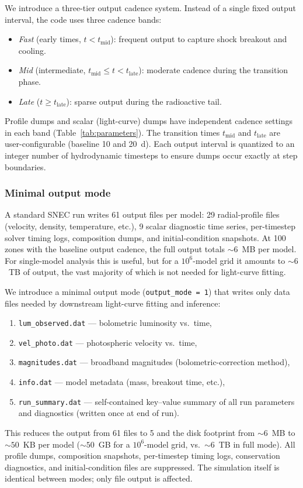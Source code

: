 \documentclass[twocolumn,linenumbers]{aastex701}
\begin{document}
We introduce a three-tier output cadence system. Instead of a single fixed output interval, the code uses three cadence bands:
\begin{itemize}
\item \textit{Fast} (early times, $t < t_{\mathrm{mid}}$): frequent output to capture shock breakout and cooling.
\item \textit{Mid} (intermediate, $t_{\mathrm{mid}} \leq t < t_{\mathrm{late}}$): moderate cadence during the transition phase.
\item \textit{Late} ($t \geq t_{\mathrm{late}}$): sparse output during the radioactive tail.
\end{itemize}
Profile dumps and scalar (light-curve) dumps have independent cadence settings in each band (Table~\ref{tab:parameters}). The transition times $t_{\mathrm{mid}}$ and $t_{\mathrm{late}}$ are user-configurable (baseline 10 and 20~d). Each output interval is quantized to an integer number of hydrodynamic timesteps to ensure dumps occur exactly at step boundaries.

\subsubsection{Minimal output mode}
\label{sec:output_mode}

A standard SNEC run writes 61 output files per model: 29 radial-profile files (velocity, density, temperature, etc.), 9 scalar diagnostic time series, per-timestep solver timing logs, composition dumps, and initial-condition snapshots. At 100 zones with the baseline output cadence, the full output totals ${\sim}6$~MB per model. For single-model analysis this is useful, but for a $10^6$-model grid it amounts to ${\sim}6$~TB of output, the vast majority of which is not needed for light-curve fitting.

We introduce a minimal output mode (\texttt{output\_mode\,=\,1}) that writes only data files needed by downstream light-curve fitting and inference:
\begin{enumerate}
\item \texttt{lum\_observed.dat} --- bolometric luminosity vs.\ time,
\item \texttt{vel\_photo.dat} --- photospheric velocity vs.\ time,
\item \texttt{magnitudes.dat} --- broadband magnitudes (bolometric-correction method),
\item \texttt{info.dat} --- model metadata (mass, breakout time, etc.),
\item \texttt{run\_summary.dat} --- self-contained key--value summary of all run parameters and diagnostics (written once at end of run).
\end{enumerate}
This reduces the output from 61 files to 5 and the disk footprint from ${\sim}6$~MB to ${\sim}50$~KB per model (${\sim}50$~GB for a $10^6$-model grid, vs.\ ${\sim}6$~TB in full mode). All profile dumps, composition snapshots, per-timestep timing logs, conservation diagnostics, and initial-condition files are suppressed. The simulation itself is identical between modes; only file output is affected.
\end{document}
